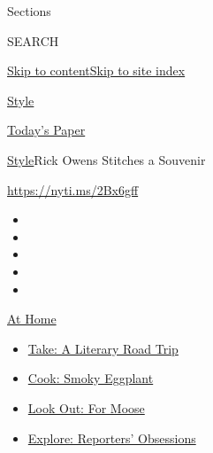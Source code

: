 Sections

SEARCH

\protect\hyperlink{site-content}{Skip to
content}\protect\hyperlink{site-index}{Skip to site index}

\href{https://www.nytimes3xbfgragh.onion/section/style}{Style}

\href{https://myaccount.nytimes3xbfgragh.onion/auth/login?response_type=cookie\&client_id=vi}{}

\href{https://www.nytimes3xbfgragh.onion/section/todayspaper}{Today's
Paper}

\href{/section/style}{Style}\textbar{}Rick Owens Stitches a Souvenir

\url{https://nyti.ms/2Bx6gff}

\begin{itemize}
\item
\item
\item
\item
\item
\end{itemize}

\href{https://www.nytimes3xbfgragh.onion/spotlight/at-home?action=click\&pgtype=Article\&state=default\&region=TOP_BANNER\&context=at_home_menu}{At
Home}

\begin{itemize}
\tightlist
\item
  \href{https://www.nytimes3xbfgragh.onion/2020/07/28/books/time-for-a-literary-road-trip.html?action=click\&pgtype=Article\&state=default\&region=TOP_BANNER\&context=at_home_menu}{Take:
  A Literary Road Trip}
\item
  \href{https://www.nytimes3xbfgragh.onion/2020/07/29/magazine/bored-with-your-home-cooking-some-smoky-eggplant-will-fix-that.html?action=click\&pgtype=Article\&state=default\&region=TOP_BANNER\&context=at_home_menu}{Cook:
  Smoky Eggplant}
\item
  \href{https://www.nytimes3xbfgragh.onion/2020/07/27/travel/moose-michigan-isle-royale.html?action=click\&pgtype=Article\&state=default\&region=TOP_BANNER\&context=at_home_menu}{Look
  Out: For Moose}
\item
  \href{https://www.nytimes3xbfgragh.onion/interactive/2020/at-home/even-more-reporters-editors-diaries-lists-recommendations.html?action=click\&pgtype=Article\&state=default\&region=TOP_BANNER\&context=at_home_menu}{Explore:
  Reporters' Obsessions}
\end{itemize}

